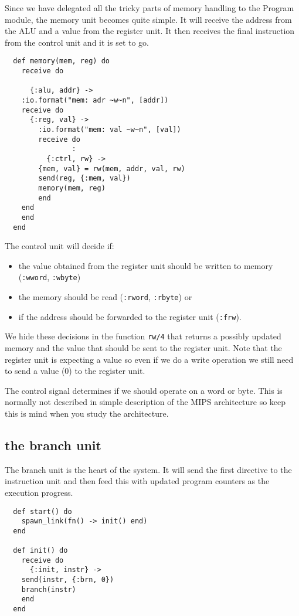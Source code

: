 \documentclass[a4paper,11pt]{article}
\begin{document}
Since we have delegated all the tricky parts of memory handling to the
Program module, the memory unit becomes quite simple. It will receive
the address from the ALU and a value from the register unit. It then
receives the final instruction from the control unit and it is set to go.

\begin{verbatim}
  def memory(mem, reg) do
    receive do

      {:alu, addr} ->
	:io.format("mem: adr ~w~n", [addr])
	receive do
	  {:reg, val} ->
	    :io.format("mem: val ~w~n", [val])
	    receive do
                :
	      {:ctrl, rw} ->
		{mem, val} = rw(mem, addr, val, rw)
		send(reg, {:mem, val})
		memory(mem, reg)
	    end
	end
    end
  end
\end{verbatim}

The control unit will decide if:

\begin{itemize}
\item the value obtained from the register unit should be written to memory ({\tt :wword}, {\tt :wbyte})
  
\item the memory should be read ({\tt :rword}, {\tt :rbyte}) or
  
\item if the address should be forwarded to the register unit ({\tt :frw}).

\end{itemize}

We hide these decisions in the function {\tt rw/4} that returns a
possibly updated memory and the value that should be sent to the
register unit. Note that the register unit is expecting a value so
even if we do a write operation we still need to send a value (0) to
the register unit.

The control signal determines if we should operate on a word or
byte. This is normally not described in simple description of the MIPS
architecture so keep this is mind when you study the architecture.

\subsection*{the branch unit}

The branch unit is the heart of the system. It will send the first
directive to the instruction unit and then feed this with updated
program counters as the execution progress.

\begin{verbatim}
  def start() do
    spawn_link(fn() -> init() end)
  end

  def init() do
    receive do
      {:init, instr} ->
	send(instr, {:brn, 0})
	branch(instr)
    end
  end
\end{verbatim}
\end{document}
